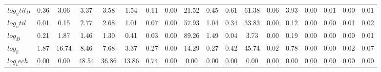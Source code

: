 \begin{center}
\begin{longtable}{lccccccccccccccccc}
$log_util_D   $	 & 	            0.36	 & 	            3.06	 & 	            3.37	 & 	            3.58	 & 	            1.54	 & 	            0.11	 & 	            0.00	 & 	           21.52	 & 	            0.45	 & 	            0.61	 & 	           61.38	 & 	            0.06	 & 	            3.93	 & 	            0.00	 & 	            0.01	 & 	            0.00	 & 	            0.01 \\ 
$log_util     $	 & 	            0.01	 & 	            0.15	 & 	            2.77	 & 	            2.68	 & 	            1.01	 & 	            0.07	 & 	            0.00	 & 	           57.93	 & 	            1.04	 & 	            0.34	 & 	           33.83	 & 	            0.00	 & 	            0.12	 & 	            0.00	 & 	            0.00	 & 	            0.01	 & 	            0.02 \\ 
$log_D        $	 & 	            0.21	 & 	            1.87	 & 	            1.46	 & 	            1.30	 & 	            0.41	 & 	            0.03	 & 	            0.00	 & 	           89.26	 & 	            1.49	 & 	            0.04	 & 	            3.73	 & 	            0.00	 & 	            0.19	 & 	            0.00	 & 	            0.00	 & 	            0.00	 & 	            0.01 \\ 
$log_h        $	 & 	            1.87	 & 	           16.74	 & 	            8.46	 & 	            7.68	 & 	            3.37	 & 	            0.27	 & 	            0.00	 & 	           14.29	 & 	            0.27	 & 	            0.42	 & 	           45.74	 & 	            0.02	 & 	            0.78	 & 	            0.00	 & 	            0.00	 & 	            0.02	 & 	            0.07 \\ 
$log_tech     $	 & 	            0.00	 & 	            0.00	 & 	           48.54	 & 	           36.86	 & 	           13.86	 & 	            0.74	 & 	            0.00	 & 	            0.00	 & 	            0.00	 & 	            0.00	 & 	            0.00	 & 	            0.00	 & 	            0.00	 & 	            0.00	 & 	            0.00	 & 	            0.00	 & 	            0.00 \\ 
\end{longtable}
 \end{center}
